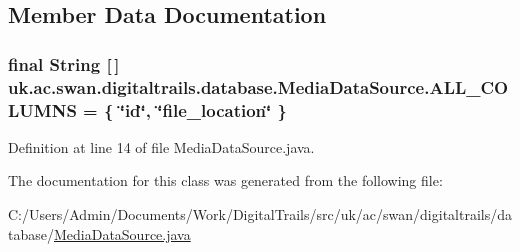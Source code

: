 \subsection{Member Data Documentation}
\hypertarget{classuk_1_1ac_1_1swan_1_1digitaltrails_1_1database_1_1_media_data_source_a1da52fc2b3e0eafb762c0f18a04c82e8}{
\subsubsection[{A\+L\+L\+\_\+\+C\+O\+L\+U\+M\+N\+S}]{\setlength{\rightskip}{0pt plus 5cm}final String \mbox{[}$\,$\mbox{]} uk.\+ac.\+swan.\+digitaltrails.\+database.\+Media\+Data\+Source.\+A\+L\+L\+\_\+\+C\+O\+L\+U\+M\+N\+S = \{ \char`\"{}id\char`\"{}, \char`\"{}file\+\_\+location\char`\"{} \}\hspace{0.3cm}{\ttfamily [protected]}}}\label{classuk_1_1ac_1_1swan_1_1digitaltrails_1_1database_1_1_media_data_source_a1da52fc2b3e0eafb762c0f18a04c82e8}


Definition at line 14 of file Media\+Data\+Source.\+java.



The documentation for this class was generated from the following file\+:\begin{DoxyCompactItemize}
\item 
C\+:/\+Users/\+Admin/\+Documents/\+Work/\+Digital\+Trails/src/uk/ac/swan/digitaltrails/database/\hyperlink{_media_data_source_8java}{Media\+Data\+Source.\+java}\end{DoxyCompactItemize}
